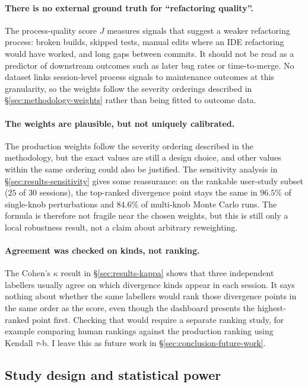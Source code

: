 \paragraph{There is no external ground truth for ``refactoring quality''.}
The process-quality score $J$ measures signals that suggest a weaker refactoring process: broken builds, skipped tests, manual edits where an IDE refactoring would have worked, and long gaps between commits. It should not be read as a predictor of downstream outcomes such as later bug rates or time-to-merge. No dataset links session-level process signals to maintenance outcomes at this granularity, so the weights follow the severity orderings described in \S\ref{sec:methodology-weights} rather than being fitted to outcome data.

\paragraph{The weights are plausible, but not uniquely calibrated.}
The production weights follow the severity ordering described in the methodology, but the exact values are still a design choice, and other values within the same ordering could also be justified. The sensitivity analysis in \S\ref{sec:results-sensitivity} gives some reassurance: on the rankable user-study subset ($25$ of $30$ sessions), the top-ranked divergence point stays the same in $96.5\%$ of single-knob perturbations and $84.6\%$ of multi-knob Monte Carlo runs. The formula is therefore not fragile near the chosen weights, but this is still only a local robustness result, not a claim about arbitrary reweighting.

\paragraph{Agreement was checked on kinds, not ranking.}
The Cohen's $\kappa$ result in \S\ref{sec:results-kappa} shows that three independent labellers usually agree on which divergence kinds appear in each session. It says nothing about whether the same labellers would rank those divergence points in the same order as the score, even though the dashboard presents the highest-ranked point first. Checking that would require a separate ranking study, for example comparing human rankings against the production ranking using Kendall $\tau$-b. I leave this as future work in \S\ref{sec:conclusion-future-work}.

\subsection{Study design and statistical power}
\label{sec:threats-study-design}

